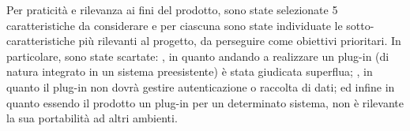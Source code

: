 Per praticità e rilevanza ai fini del prodotto, sono state selezionate 5 caratteristiche da considerare e per ciascuna sono state individuate le sotto-caratteristiche più rilevanti al progetto, da perseguire come obiettivi prioritari. In particolare, sono state scartate: , in quanto andando a realizzare un plug-in (di natura integrato in un sistema preesistente) è stata giudicata superflua; , in quanto il plug-in non dovrà gestire autenticazione o raccolta di dati; ed infine  in quanto essendo il prodotto un plug-in per un determinato sistema, non è rilevante la sua portabilità ad altri ambienti. 

\pagebreak